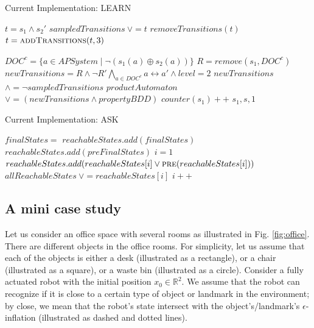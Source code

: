 \documentclass{article}
\begin{document}
\begin{algorithm}
	\caption{Current Implementation: LEARN}\label{alg:current_learn}
	\begin{algorithmic}[1]
		\State $t=s_1\wedge s_2'$
		\State $sampledTransitions\ \vee = t$
		\State $removeTransitions(t)$
		\State $t=\Call{addTransitions}{t,3}$	
		
		\State $DOC^c=\{a\in APSystem\mid \neg(s_1(a)\oplus s_2(a))\}$
		\State $R=remove(s_1,DOC^c)$
		\State $newTransitions=R \wedge \neg R' \bigwedge\limits_{a\in DOC^c} a\leftrightarrow a' \wedge level=2$
		\State{}
		\State $newTransitions$ $\wedge=\neg sampledTransitions$
		\State $productAutomaton $ $\vee= (newTransitions \wedge propertyBDD)$
		\State $counter(s_1)++$
			\State {}
			\State {} {$s_1,s,1$}
		\EndFor
		\EndIf
		\EndProcedure
	\end{algorithmic}
\end{algorithm}


\begin{algorithm}
	\caption{Current Implementation: ASK}\label{alg:current_ask}
	\begin{algorithmic}[1]
		\State $finalStates=$
		\State $reachableStates.add(finalStates)$
		\State $reachableStates.add(preFinalStates)$
		\State $i=1$
			\State $reachableStates.add(reachableStates[i]\vee \Call{pre}{reachableStates[i]})$
			\State $allReachableStates\ \vee=reachableStates[i]$
			\State $i++$
		\EndWhile
		\State {}
		\EndProcedure
	\end{algorithmic}
\end{algorithm}

\subsection{A mini case study}

Let us consider an office space with several rooms as illustrated in Fig. \ref{fig:office}. There are different objects in the office rooms. For simplicity, let us assume that each of the objects is either a desk (illustrated as a rectangle), or a chair (illustrated as a square), or a waste bin (illustrated as a circle). Consider a fully actuated robot with the initial position $x_0 \in \mathbb{R}^2$. We assume that the robot can recognize if it is close to a certain type of object or landmark in the environment; by close, we mean that the robot's state intersect with the object's/landmark's $\epsilon$-inflation (illustrated as dashed and dotted lines).
\end{document}
